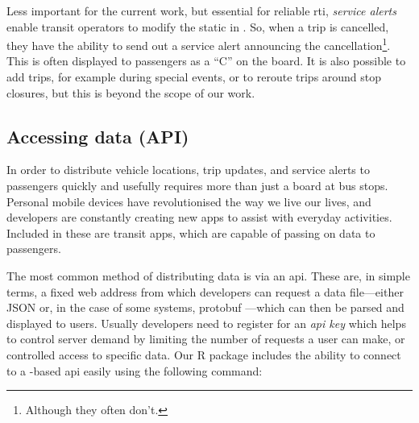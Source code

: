 Less important for the current work, but essential for reliable \gls{rti}, \emph{service alerts} enable transit operators to modify the static \GTFS{} in \rt{}. So, when a trip is cancelled, they have the ability to send out a service alert announcing the cancellation\footnote{Although they often don't.}. This is often displayed to passengers as a ``C'' on the \rt{} board. It is also possible to add trips, for example during special events, or to reroute trips around stop closures, but this is beyond the scope of our work.



\subsection{Accessing \rt{} data (API)}
\label{sec:gtfs_rt_api}

In order to distribute vehicle locations, trip updates, and service alerts to passengers quickly and usefully requires more than just a \rt{} board at bus stops. Personal mobile devices have revolutionised the way we live our lives, and developers are constantly creating new apps to assist with everyday activities. Included in these are transit apps, which are capable of passing on \rt{} \GTFS{} data to passengers.

The most common method of distributing \rt{} data is via an \gls{api}. These are, in simple terms, a fixed web address from which developers can request a data file---either JSON or, in the case of some \GTFS{} systems, protobuf \citep{cn}---which can then be parsed and displayed to users. Usually developers need to register for an \emph{\gls{api} key} which helps to control server demand by limiting the number of requests a user can make, or controlled access to specific data. Our R package includes the ability to connect to a \GTFS{}-based \gls{api} easily using the following command:
\begin{knitrout}\small
{}\color{fgcolor}
\end{knitrout}
